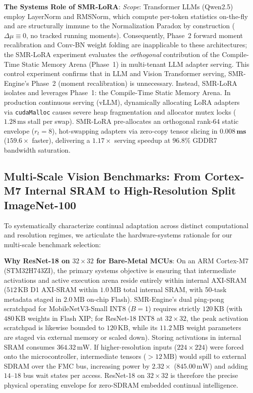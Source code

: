 \documentclass{article}
\begin{document}
\noindent\textbf{The Systems Role of SMR-LoRA}:
\textit{Scope}: Transformer LLMs (Qwen2.5) employ LayerNorm and RMSNorm, which compute per-token statistics on-the-fly and are structurally immune to the Normalization Paradox by construction ($\Delta\mu \equiv 0$, no tracked running moments). Consequently, Phase~2 forward moment recalibration and Conv-BN weight folding are inapplicable to these architectures; the SMR-LoRA experiment evaluates the \textit{orthogonal} contribution of the Compile-Time Static Memory Arena (Phase~1) in multi-tenant LLM adapter serving.
This control experiment confirms that in LLM and Vision Transformer serving, SMR-Engine's Phase~2 (moment recalibration) is unnecessary. Instead, SMR-LoRA isolates and leverages Phase~1: the Compile-Time Static Memory Arena. In production continuous serving (vLLM), dynamically allocating LoRA adapters via \texttt{cudaMalloc} causes severe heap fragmentation and allocator mutex locks ($1.28\,\text{ms}$ stall per swap). SMR-LoRA pre-allocates an orthogonal rank-$64$ static envelope ($r_t=8$), hot-swapping adapters via zero-copy tensor slicing in $\mathbf{0.008\,\text{ms}}$ ($\mathbf{159.6\times}$ faster), delivering a $1.17\times$ serving speedup at $96.8\%$ GDDR7 bandwidth saturation.

\subsection{Multi-Scale Vision Benchmarks: From Cortex-M7 Internal SRAM to High-Resolution Split ImageNet-100}
\label{sec:app_multiscale_vision}
To systematically characterize continual adaptation across distinct computational and resolution regimes, we articulate the hardware-systems rationale for our multi-scale benchmark selection:

\noindent\textbf{Why ResNet-18 on $32\times32$ for Bare-Metal MCUs}:
On an ARM Cortex-M7 (STM32H743ZI), the primary systems objective is ensuring that intermediate activations and active execution arena reside entirely within internal AXI-SRAM ($512\,\text{KB}$ D1 AXI-SRAM within $1.0\,\text{MB}$ total internal SRAM, with 50-task metadata staged in $2.0\,\text{MB}$ on-chip Flash). SMR-Engine's dual ping-pong scratchpad for MobileNetV3-Small INT8 ($B=1$) requires strictly $120\,\text{KB}$ (with $480\,\text{KB}$ weights in Flash XIP; for ResNet-18 INT8 at $32\times32$, the peak activation scratchpad is likewise bounded to $120\,\text{KB}$, while its $11.2\,\text{MB}$ weight parameters are staged via external memory or scaled down). Storing activations in internal SRAM consumes $364.32\,\text{mW}$. If higher-resolution inputs ($224\times224$) were forced onto the microcontroller, intermediate tensors ($>12\,\text{MB}$) would spill to external SDRAM over the FMC bus, increasing power by $2.32\times$ ($845.00\,\text{mW}$) and adding $14\text{--}18$ bus wait states per access. ResNet-18 on $32\times32$ is therefore the precise physical operating envelope for zero-SDRAM embedded continual intelligence.
\end{document}
